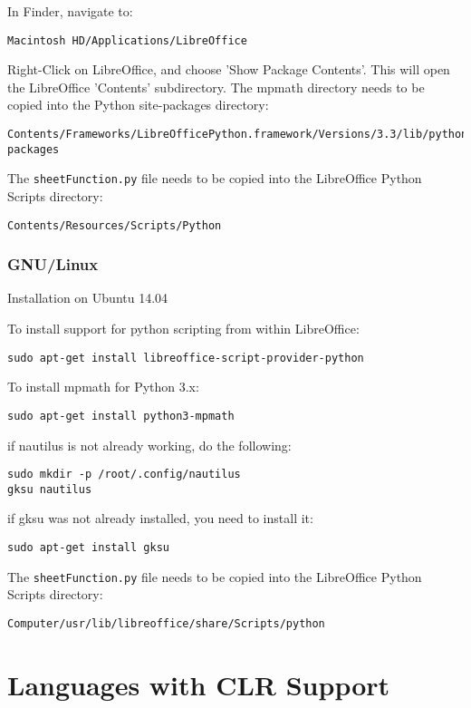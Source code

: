 In Finder, navigate to:
\begin{verbatim}
Macintosh HD/Applications/LibreOffice
\end{verbatim}	
Right-Click on LibreOffice, and choose 'Show Package Contents'. This will open the LibreOffice  'Contents' subdirectory.
The mpmath directory needs to be copied into the Python site-packages directory:
\begin{verbatim}
Contents/Frameworks/LibreOfficePython.framework/Versions/3.3/lib/python3.3/site-packages
\end{verbatim}
The \verb|sheetFunction.py| file needs to be copied into the  LibreOffice Python Scripts directory:
\begin{verbatim}
Contents/Resources/Scripts/Python
\end{verbatim}


\subsection{GNU/Linux}
Installation on Ubuntu 14.04

To install support for python scripting from within LibreOffice:
\begin{verbatim}
sudo apt-get install libreoffice-script-provider-python
\end{verbatim}

To install mpmath for Python 3.x:
\begin{verbatim}
sudo apt-get install python3-mpmath
\end{verbatim}

if nautilus is not already working, do the following:
\begin{verbatim}
sudo mkdir -p /root/.config/nautilus
gksu nautilus
\end{verbatim}

if gksu was not already installed, you need to install it:
\begin{verbatim}
sudo apt-get install gksu
\end{verbatim}

The \verb|sheetFunction.py| file needs to be copied into the LibreOffice Python Scripts directory:
\begin{verbatim}
Computer/usr/lib/libreoffice/share/Scripts/python
\end{verbatim}






\chapter{Languages with CLR Support}
\label{Languages with CLR Support}

